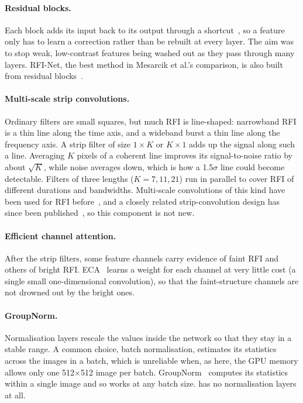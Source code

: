 \paragraph{Residual blocks.} Each block adds its input back to its output
through a shortcut~\cite{he2016}, so a feature only has to learn a correction
rather than be rebuilt at every layer. The aim was to stop weak, low-contrast
features being washed out as they pass through many layers. RFI-Net, the best
method in Mesarcik et al.'s comparison, is also built from residual
blocks~\cite{yang2020rfinet}.

\paragraph{Multi-scale strip convolutions.} Ordinary filters are small
squares, but much RFI is line-shaped: narrowband RFI is a thin line along the
time axis, and a wideband burst a thin line along the frequency axis. A strip
filter of size $1\times K$ or $K\times1$ adds up the signal along such a line.
Averaging $K$ pixels of a coherent line improves its signal-to-noise ratio by
about $\sqrt{K}$, while noise averages down, which is how a 1.5$\sigma$ line
could become detectable. Filters of three lengths ($K = 7, 11, 21$) run in
parallel to cover RFI of different durations and bandwidths. Multi-scale
convolutions of this kind have been used for RFI before~\cite{gu2024emsca}, and
a closely related strip-convolution design has since been
published~\cite{mars2026}, so this component is not new.

\paragraph{Efficient channel attention.} After the strip filters, some feature
channels carry evidence of faint RFI and others of bright RFI. ECA~\cite{wang2020eca}
learns a weight for each channel at very little cost (a single small
one-dimensional convolution), so that the faint-structure channels are not
drowned out by the bright ones.

\paragraph{GroupNorm.} Normalisation layers rescale the values inside the
network so that they stay in a stable range. A common choice, batch
normalisation, estimates its statistics across the images in a batch, which is
unreliable when, as here, the GPU memory allows only one 512$\times$512 image
per batch. GroupNorm~\cite{wu2018groupnorm} computes its statistics within a
single image and so works at any batch size. \tfunet{} has no normalisation
layers at all.

